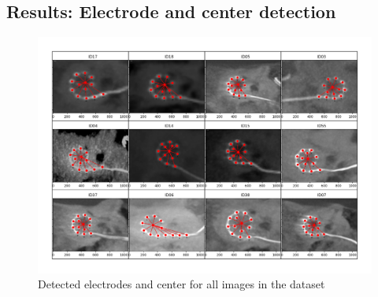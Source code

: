 \documentclass[a4paper, 10pt, twocolumn]{article}
\begin{document}
\begin{landscape}

\appendix
\section{Results: Electrode and center detection}
\begin{figure}[ht]
    \includegraphics[width=\textwidth]{results.png}
	\caption{Detected electrodes and center for all images in the dataset}
	\label{results_complete}
\end{figure}
\end{landscape}
\end{document}
